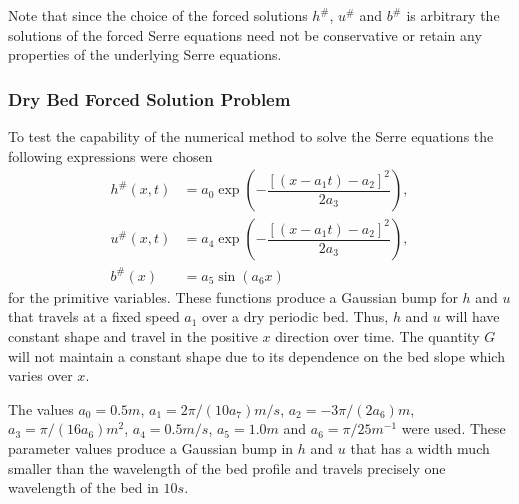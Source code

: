 \documentclass[times]{elsarticle}
\begin{document}
Note that since the choice of the forced solutions $h^\#$, $u^\#$ and $b^\#$ is arbitrary the solutions of the forced Serre equations need not be conservative or retain any properties of the underlying Serre equations. 

\subsubsection{Dry Bed Forced Solution Problem}
To test the capability of the numerical method to solve the Serre equations the following expressions were chosen
\begin{subequations}
	\begin{align}
	\label{eqn:ForcedSolutionxt}
	h^\#(x,t) &=  a_0 \exp\left(-\dfrac{\left[\left(x - a_1 t\right) - a_2\right]^2}{2 a_3}\right), \\
	u^\#(x,t) &= a_4 \exp\left(-\dfrac{\left[\left(x - a_1 t\right) - a_2\right]^2}{2 a_3}\right), \\
	b^\#(x) &= a_5 \sin\left(a_6 x\right)
	\end{align}
\end{subequations}
for the primitive variables. These functions produce a Gaussian bump for $h$ and $u$ that travels at a fixed speed $a_1$ over a dry periodic bed. Thus, $h$ and $u$ will have constant shape and travel in the positive $x$ direction over time. The quantity $G$ will not maintain a constant shape due to its dependence on the bed slope which varies over $x$.

The values $a_0 = 0.5m$, $a_1 = 2 \pi / \left(10 a_7\right) m/s$, $a_2 =- 3\pi/ \left(2 a_6\right)m$, $a_3 = \pi / (16 a_6) m^2$, $a_4 = 0.5 m/s$, $a_5 = 1.0 m$ and $a_6 = \pi / 25 m^{-1}$ were used. These parameter values produce a Gaussian bump in $h$ and $u$ that has a width much smaller than the wavelength of the bed profile and travels precisely one wavelength of the bed in $10s$. 
\end{document}
